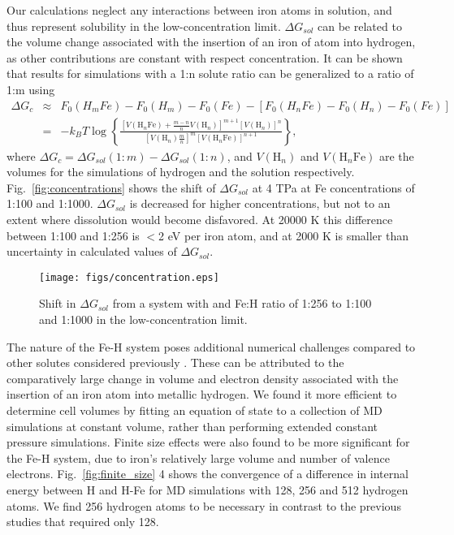 Our calculations neglect any interactions between iron atoms in solution, and
thus represent solubility in the low-concentration limit.
$\Delta G_{sol}$ can be related to the volume change associated with
the insertion of an iron of atom into hydrogen, as other contributions are
constant with respect concentration. It can be shown that results for
simulations with a 1:n solute ratio can be generalized to a ratio of 1:m using
  \begin{eqnarray}
  \Delta G_c &\approx& F_0(H_mFe)-F_0(H_m)-F_0(Fe)- \left[
    F_0(H_nFe)-F_0(H_n)-F_0(Fe)\right] \\
    &=& -k_BT\log\left\{ 
    \frac{\left[V(\mathrm{H}_n\mathrm{Fe}) +
    \frac{m-n}{n}V(\mathrm{H}_n)\right]^{m+1}
    \left[V(\mathrm{H}_n)\right]^{n}}
    {\left[V(\mathrm{H}_n)\frac{m}{n}\right]^m
    \left[V(\mathrm{H}_n\mathrm{Fe})\right]^{n + 1}}
   \right\},
\end{eqnarray}
where $\Delta G_c = \Delta G_{sol}(1:m)- \Delta G_{sol}(1:n)$, and
$V(\mathrm{H}_n)$ and $V(\mathrm{H}_n\mathrm{Fe})$ are the volumes for the
simulations of hydrogen and the solution respectively. 
Fig.~\ref{fig:concentrations} shows the shift of
$\Delta G_{sol}$ at 4 TPa at Fe concentrations of 1:100 and 1:1000. $\Delta
G_{sol}$ is decreased for higher concentrations, but not to an extent where
dissolution would become disfavored. At 20000 K
this difference between 1:100 and 1:256 is  $<$2 eV per iron atom, and
at 2000 K is smaller than uncertainty in calculated values of $\Delta
G_{sol}$.

 \begin{figure}[h] %
   \centering
   \texttt{[image: figs/concentration.eps]} 
\caption{Shift in $\Delta G_{sol}$ from a system with and Fe:H ratio of 1:256 to 1:100 and
1:1000 in the low-concentration limit.}
\end{figure}


The nature of the Fe-H system poses additional numerical challenges compared to other solutes
considered previously \citep{Wilson2010,Wilson2012a,wilson12b,Gonzalez2013}.
These can be attributed to the comparatively large change in volume
and electron density associated with the insertion of an iron atom into
metallic hydrogen. We found it
more efficient to determine cell volumes by fitting an equation of state to a
collection of MD simulations at constant volume, rather than performing
extended constant pressure simulations. 
Finite size effects were also found to be more significant for the Fe-H
system, due to iron's relatively large volume and number of valence electrons. Fig.~\ref{fig:finite_size}
4 shows the convergence of a difference in internal energy between H and H-Fe
for MD simulations with 128, 256 and 512 hydrogen atoms. We find 256 hydrogen
atoms to be necessary in contrast to the previous studies that required only 128. 


